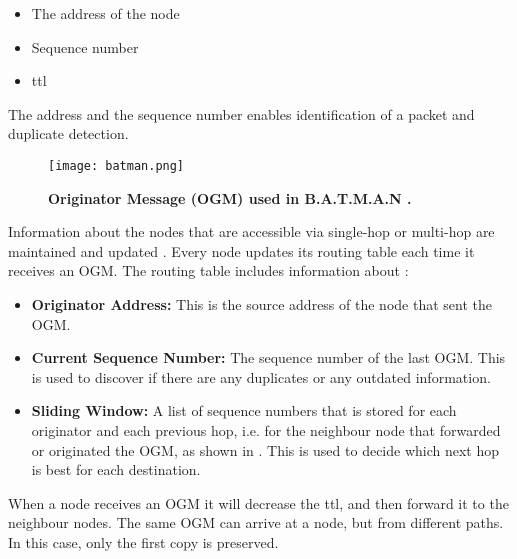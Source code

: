 \begin{itemize}
\item The address of the node
\item Sequence number
\item \gls{ttl} 
\end{itemize}

The address and the sequence number enables identification of a packet and duplicate detection. 

\begin{figure}[b]
  \centering
    \texttt{[image: batman.png]}
     \caption[Originator Message in B.A.T.M.A.N]{\textbf{Originator Message (OGM) used in B.A.T.M.A.N \cite{batman2}.}}
\label{fig:batman} 
\end{figure}


Information about the nodes that are accessible via single-hop or multi-hop are maintained and updated \cite{batman}. Every node updates its routing table each time it receives an OGM. The routing table includes information about \cite{batman2}:

\begin{itemize}
  \item \textbf{Originator Address:} This is the source address of the node that sent the OGM.
  \item \textbf{Current Sequence Number:} The sequence number of the last OGM. This is used to discover if there are any duplicates or any outdated information.
  \item \textbf{Sliding Window:} A list of sequence numbers that is stored for each originator and each previous hop, i.e. for the neighbour node that forwarded or originated the OGM, as shown in . This is used to decide which next hop is best for each destination. 
\end{itemize}

When a node receives an OGM it will decrease the \gls{ttl}, and then forward it to the neighbour nodes. The same OGM can arrive at a node, but from different paths. In this case, only the first copy is preserved. 


